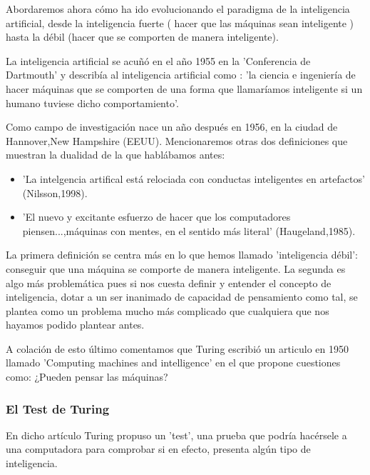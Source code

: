 Abordaremos ahora cómo ha ido evolucionando el paradigma de la inteligencia artificial, desde la inteligencia fuerte ( hacer que las máquinas sean inteligente ) hasta la débil (hacer que se comporten de manera inteligente).

\vspace{10px}


La inteligencia artificial se acuñó en el año 1955 en la 'Conferencia de Dartmouth' y describía al inteligencia artificial como : 'la ciencia e ingeniería de hacer máquinas que se comporten de una forma que llamaríamos inteligente si un humano tuviese dicho comportamiento'.

\vspace{10px} 

Como campo de investigación nace un año después en 1956, en la ciudad de Hannover,New Hampshire (EEUU). Mencionaremos otras dos definiciones que muestran la dualidad de la que hablábamos antes:

\begin{itemize}
	\item 'La intelgencia artifical está relociada con conductas inteligentes en artefactos' (Nilsson,1998).
	\item 'El nuevo y excitante esfuerzo de hacer que los computadores piensen...,máquinas con mentes, en el sentido más literal' (Haugeland,1985).
\end{itemize}

La primera definición se centra más en lo que hemos llamado 'inteligencia débil': conseguir que una máquina se comporte de manera inteligente. La segunda es algo más problemática pues si nos cuesta definir y entender el concepto de inteligencia, dotar a un ser inanimado de capacidad de pensamiento como tal, se plantea como un problema mucho más complicado que cualquiera que nos hayamos podido plantear antes.

\vspace{10px}

A colación de esto último comentamos que Turing escribió un articulo en 1950 llamado 'Computing machines and intelligence' en el que propone cuestiones como: ¿Pueden pensar las máquinas?


\subsubsection{El Test de Turing}

En dicho artículo Turing propuso un 'test', una prueba que podría hacérsele a una computadora para comprobar si en efecto, presenta algún tipo de inteligencia.


